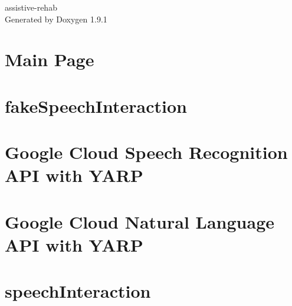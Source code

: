 \let\mypdfximage\pdfximage\def\pdfximage{\immediate\mypdfximage}\documentclass[twoside]{book}
\newcommand{\+}{\discretionary{\mbox{\scriptsize$\hookleftarrow$}}{}{}}
\newcommand{\clearemptydoublepage}{%
  \newpage{\pagestyle{empty}\cleardoublepage}%
}
\begin{document}
\raggedbottom

\begin{titlepage}
\vspace*{7cm}
\begin{center}%
{\Large assistive-\/rehab }\\
\vspace*{1cm}
{\large Generated by Doxygen 1.9.1}\\
\end{center}
\end{titlepage}
\clearemptydoublepage
{}
\tableofcontents
\clearemptydoublepage
{}

\chapter{Main Page}
\label{index}\hypertarget{index}{}
\chapter{fake\+Speech\+Interaction}
\label{md__home_runner_work_assistive_rehab_assistive_rehab_gh_pages_modules_fakeSpeechInteraction_README}

\chapter{Google Cloud Speech Recognition API with YARP}
\label{md__home_runner_work_assistive_rehab_assistive_rehab_gh_pages_modules_speechInteraction_modules_googleSpeech_README}

\chapter{Google Cloud Natural Language API with YARP}
\label{md__home_runner_work_assistive_rehab_assistive_rehab_gh_pages_modules_speechInteraction_modules_googleSpeechProcess_README}

\chapter{speech\+Interaction}
\label{md__home_runner_work_assistive_rehab_assistive_rehab_gh_pages_modules_speechInteraction_README}

\end{document}
